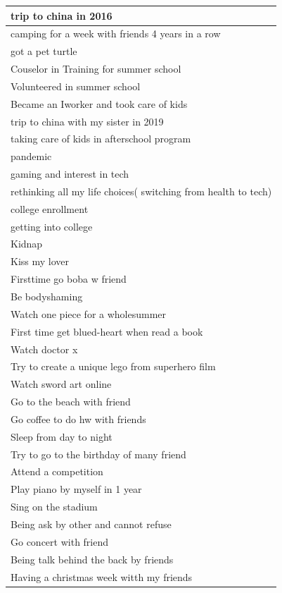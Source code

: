 \documentclass[
  .7em,
  letterpaper,
  DIV=11,
  numbers=noendperiod]{scrartcl}
\begin{document}
\begin{table}
\begin{tabular}{l}
\hline
trip to china in 2016\\
\hline
camping for a week with friends 4 years in a row\\
\hline
got a pet turtle\\
\hline
Couselor in Training for summer school\\
\hline
Volunteered in summer school\\
\hline
Became an Iworker and took care of kids\\
\hline
trip to china with my sister in 2019\\
\hline
taking care of kids in afterschool program\\
\hline
pandemic\\
\hline
gaming and interest in tech\\
\hline
rethinking all my life choices( switching from health to tech)\\
\hline
college enrollment\\
\hline
getting into college\\
\hline
Kidnap\\
\hline
Kiss my lover\\
\hline
Firsttime go boba w friend\\
\hline
Be bodyshaming\\
\hline
Watch one piece for a wholesummer\\
\hline
First time get blued-heart when read a book\\
\hline
Watch doctor x\\
\hline
Try to create a unique lego from superhero film\\
\hline
Watch sword art online\\
\hline
Go to the beach with friend\\
\hline
Go coffee to do hw with friends\\
\hline
Sleep from day to night\\
\hline
Try to go to the birthday of many friend\\
\hline
Attend a competition\\
\hline
Play piano by myself in 1 year\\
\hline
Sing on the stadium\\
\hline
Being ask by other and cannot refuse\\
\hline
Go concert with friend\\
\hline
Being talk behind the back by friends\\
\hline
Having a christmas week witth my friends\\
\hline

\end{tabular}
\end{table}
\end{document}
